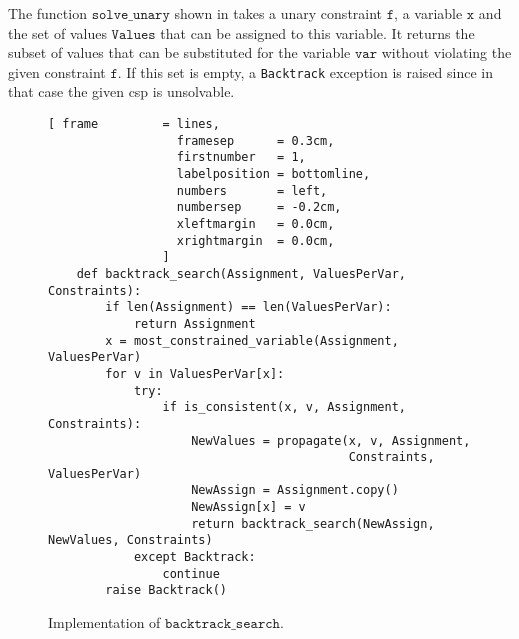 The function $\texttt{solve\_unary}$ shown in  takes a unary
constraint $\texttt{f}$, a variable $\texttt{x}$ and the set of values $\texttt{Values}$ that can be assigned to this
variable.  It returns the subset of values that can be substituted for the variable $\texttt{var}$
without violating the given constraint $\texttt{f}$.  If this set is empty, a \texttt{Backtrack} exception is
raised since in that case the given \ac{csp} is unsolvable.


\begin{figure}[!ht]
\centering
\begin{Verbatim}[ frame         = lines, 
                  framesep      = 0.3cm, 
                  firstnumber   = 1,
                  labelposition = bottomline,
                  numbers       = left,
                  numbersep     = -0.2cm,
                  xleftmargin   = 0.0cm,
                  xrightmargin  = 0.0cm,
                ]
    def backtrack_search(Assignment, ValuesPerVar, Constraints):
        if len(Assignment) == len(ValuesPerVar):
            return Assignment
        x = most_constrained_variable(Assignment, ValuesPerVar)
        for v in ValuesPerVar[x]:
            try:
                if is_consistent(x, v, Assignment, Constraints):
                    NewValues = propagate(x, v, Assignment, 
                                          Constraints, ValuesPerVar)
                    NewAssign = Assignment.copy()
                    NewAssign[x] = v
                    return backtrack_search(NewAssign, NewValues, Constraints)
            except Backtrack:
                continue
        raise Backtrack()
\end{Verbatim}
\vspace*{-0.3cm}
\caption{Implementation of $\texttt{backtrack\_search}$.}
\label{fig:Constraint-Propagation-Solver.ipynb:backtrack_search}
\end{figure}

